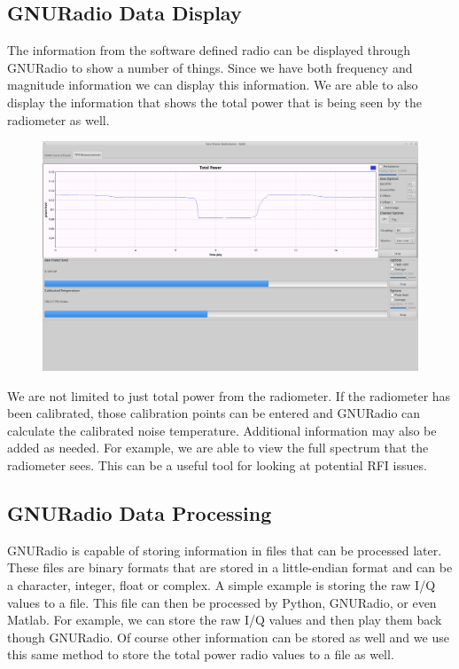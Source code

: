 \subsection{GNURadio Data Display}
The information from the software defined radio can be displayed through GNURadio to show a number of things.  Since we have both frequency and magnitude information we can display this information.  We are able to also display the information that shows the total power that is being seen by the radiometer as well.

{\begin{figure}[h!tb] 
\centering
\includegraphics[width=17cm]{Images/Lab1_TPR_at_end_exp.png}
\label{radiometer_tpr_display}
\end{figure}
}

We are not limited to just total power from the radiometer.  If the radiometer has been calibrated, those calibration points can be entered and GNURadio can calculate the calibrated noise temperature.  Additional information may also be added as needed.  For example, we are able to view the full spectrum that the radiometer sees.  This can be a useful tool for looking at potential RFI issues.    

\subsection{GNURadio Data Processing}

GNURadio is capable of storing information in files that can be processed later.  These files are binary formats that are stored in a little-endian format and can be a character, integer, float or complex.  A simple example is storing the raw I/Q values to a file.  This file can then be processed by Python, GNURadio, or even Matlab.  For example, we can store the raw I/Q values and then play them back though GNURadio.  Of course other information can be stored as well and we use this same method to store the total power radio values to a file as well.  

